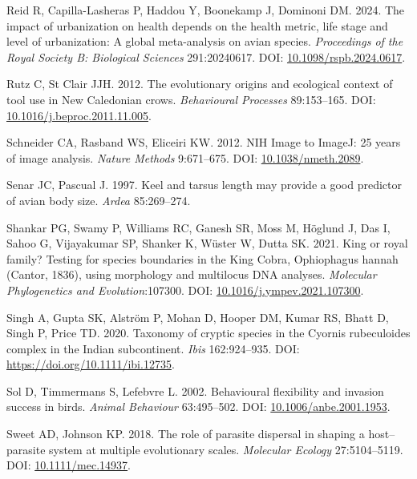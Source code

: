 \documentclass[10pt,a4paper]{article}
\newlength{\cslhangindent}
\newenvironment{CSLReferences}[2] %
 {\begin{list}{}{%
  \setlength{\itemindent}{0pt}
  \setlength{\leftmargin}{0pt}
  \setlength{\parsep}{0pt}
  \ifodd #1
   \setlength{\leftmargin}{\cslhangindent}
   \setlength{\itemindent}{-1\cslhangindent}
  \fi
  \setlength{\itemsep}{#2\baselineskip}}}
 {\end{list}}
\begin{document}
\begin{CSLReferences}{1}{0}
Reid R, Capilla-Lasheras P, Haddou Y, Boonekamp J, Dominoni DM. 2024. The impact of urbanization on health depends on the health metric, life stage and level of urbanization: A global meta-analysis on avian species. \emph{Proceedings of the Royal Society B: Biological Sciences} 291:20240617. DOI: \href{https://doi.org/10.1098/rspb.2024.0617}{10.1098/rspb.2024.0617}.

Rutz C, St Clair JJH. 2012. The evolutionary origins and ecological context of tool use in {New} {Caledonian} crows. \emph{Behavioural Processes} 89:153--165. DOI: \href{https://doi.org/10.1016/j.beproc.2011.11.005}{10.1016/j.beproc.2011.11.005}.

Schneider CA, Rasband WS, Eliceiri KW. 2012. {NIH} {Image} to {ImageJ}: 25 years of image analysis. \emph{Nature Methods} 9:671--675. DOI: \href{https://doi.org/10.1038/nmeth.2089}{10.1038/nmeth.2089}.

Senar JC, Pascual J. 1997. Keel and tarsus length may provide a good predictor of avian body size. \emph{Ardea} 85:269--274.

Shankar PG, Swamy P, Williams RC, Ganesh SR, Moss M, Höglund J, Das I, Sahoo G, Vijayakumar SP, Shanker K, Wüster W, Dutta SK. 2021. King or royal family? {Testing} for species boundaries in the {King} {Cobra}, {Ophiophagus} hannah ({Cantor}, 1836), using morphology and multilocus {DNA} analyses. \emph{Molecular Phylogenetics and Evolution}:107300. DOI: \href{https://doi.org/10.1016/j.ympev.2021.107300}{10.1016/j.ympev.2021.107300}.

Singh A, Gupta SK, Alström P, Mohan D, Hooper DM, Kumar RS, Bhatt D, Singh P, Price TD. 2020. Taxonomy of cryptic species in the {Cyornis} rubeculoides complex in the {Indian} subcontinent. \emph{Ibis} 162:924--935. DOI: \url{https://doi.org/10.1111/ibi.12735}.

Sol D, Timmermans S, Lefebvre L. 2002. Behavioural flexibility and invasion success in birds. \emph{Animal Behaviour} 63:495--502. DOI: \href{https://doi.org/10.1006/anbe.2001.1953}{10.1006/anbe.2001.1953}.

Sweet AD, Johnson KP. 2018. The role of parasite dispersal in shaping a host--parasite system at multiple evolutionary scales. \emph{Molecular Ecology} 27:5104--5119. DOI: \href{https://doi.org/10.1111/mec.14937}{10.1111/mec.14937}.


\end{CSLReferences}
\end{document}
